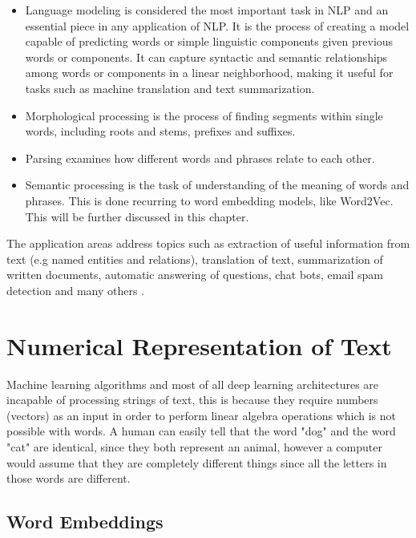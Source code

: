 \begin{itemize}
    \item Language modeling is considered the most important task in NLP and an essential piece in any application of NLP. It is the process of creating a model capable of predicting words or simple linguistic components given previous words or components. It can capture syntactic and semantic relationships among words or components in a linear neighborhood, making it useful for tasks such as machine translation and text summarization.
    \item Morphological processing is the process of finding segments within single words,  including roots and stems, prefixes and suffixes.
    \item Parsing examines how different words and phrases relate to each other.
    \item Semantic processing is the task of understanding of the meaning of words and phrases. This is done recurring to  word embedding models, like Word2Vec. This will be further discussed in this chapter.
\end{itemize}





The application areas address topics such as extraction of useful information from text (e.g named entities and relations), translation of text, summarization of written documents, automatic answering of questions, chat bots, email spam detection and many others \cite{Otter2018}.




\section{Numerical Representation of Text}
\label{sec:num}

\par Machine learning algorithms and most of all deep learning architectures are incapable of processing strings of text, this is because they require numbers (vectors) as an input in order to perform linear algebra operations \cite{Vidhya2017} which is not possible with words. A human can easily tell that the word "dog" and the word "cat" are identical, since they both represent an animal, however a computer would assume that they are completely different things since all the letters in those  words are different. 

    \subsection{Word Embeddings}

